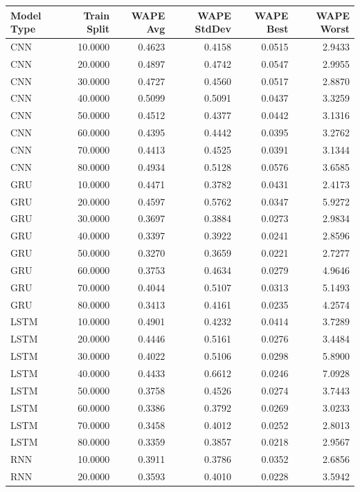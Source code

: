 \begin{tabular}{lrrrrr}
\toprule
Model Type & Train Split & WAPE Avg & WAPE StdDev & WAPE Best & WAPE Worst \\
\midrule
CNN & 10.0000 & 0.4623 & 0.4158 & 0.0515 & 2.9433 \\
CNN & 20.0000 & 0.4897 & 0.4742 & 0.0547 & 2.9955 \\
CNN & 30.0000 & 0.4727 & 0.4560 & 0.0517 & 2.8870 \\
CNN & 40.0000 & 0.5099 & 0.5091 & 0.0437 & 3.3259 \\
CNN & 50.0000 & 0.4512 & 0.4377 & 0.0442 & 3.1316 \\
CNN & 60.0000 & 0.4395 & 0.4442 & 0.0395 & 3.2762 \\
CNN & 70.0000 & 0.4413 & 0.4525 & 0.0391 & 3.1344 \\
CNN & 80.0000 & 0.4934 & 0.5128 & 0.0576 & 3.6585 \\
GRU & 10.0000 & 0.4471 & 0.3782 & 0.0431 & 2.4173 \\
GRU & 20.0000 & 0.4597 & 0.5762 & 0.0347 & 5.9272 \\
GRU & 30.0000 & 0.3697 & 0.3884 & 0.0273 & 2.9834 \\
GRU & 40.0000 & 0.3397 & 0.3922 & 0.0241 & 2.8596 \\
GRU & 50.0000 & 0.3270 & 0.3659 & 0.0221 & 2.7277 \\
GRU & 60.0000 & 0.3753 & 0.4634 & 0.0279 & 4.9646 \\
GRU & 70.0000 & 0.4044 & 0.5107 & 0.0313 & 5.1493 \\
GRU & 80.0000 & 0.3413 & 0.4161 & 0.0235 & 4.2574 \\
LSTM & 10.0000 & 0.4901 & 0.4232 & 0.0414 & 3.7289 \\
LSTM & 20.0000 & 0.4446 & 0.5161 & 0.0276 & 3.4484 \\
LSTM & 30.0000 & 0.4022 & 0.5106 & 0.0298 & 5.8900 \\
LSTM & 40.0000 & 0.4433 & 0.6612 & 0.0246 & 7.0928 \\
LSTM & 50.0000 & 0.3758 & 0.4526 & 0.0274 & 3.7443 \\
LSTM & 60.0000 & 0.3386 & 0.3792 & 0.0269 & 3.0233 \\
LSTM & 70.0000 & 0.3458 & 0.4012 & 0.0252 & 2.8013 \\
LSTM & 80.0000 & 0.3359 & 0.3857 & 0.0218 & 2.9567 \\
RNN & 10.0000 & 0.3911 & 0.3786 & 0.0352 & 2.6856 \\
RNN & 20.0000 & 0.3593 & 0.4010 & 0.0228 & 3.5942 \\

\end{tabular}
